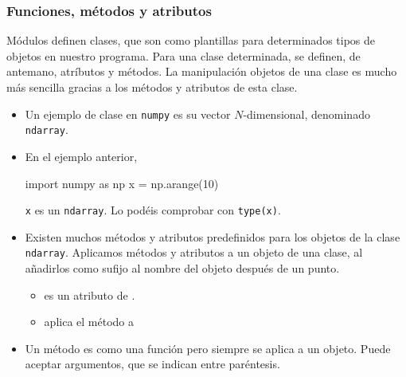 \documentclass[handout,9pt]{beamer}
\begin{document}
\begin{frame}[fragile]
  \frametitle{Funciones, métodos y atributos}
  \begin{block}{}
    Módulos definen clases, que son como plantillas para determinados
    tipos de objetos en nuestro programa. Para una clase determinada,
    se definen, de antemano, atríbutos y métodos. La manipulación
    objetos de una clase es mucho más sencilla gracias a los métodos y
    atributos de esta clase.
  \end{block}
  \begin{itemize}
  \item<2-> Un ejemplo de clase en  {\tt numpy} es su vector
    $N$-dimensional, denominado {\tt ndarray}.
  \item<3-> En el ejemplo anterior,
        \begin{pyverbatim}
import numpy as np
x = np.arange(10)          
\end{pyverbatim}
{\tt x} es un {\tt ndarray}. Lo podéis comprobar con  {\tt type(x)}.
\item<4-> Existen muchos métodos y atributos predefinidos para los
  objetos de la clase  {\tt ndarray}. Aplicamos métodos y atributos a
  un objeto de una clase, al añadirlos como sufijo al nombre del
  objeto después de un punto.
  \begin{itemize}
  \item<5->  es un atributo de  .
  \item<5->  aplica el método  a 
  \end{itemize}
\item<6-> Un método es como una función pero siempre se aplica a un
  objeto. Puede aceptar argumentos, que se indican entre paréntesis.
  \end{itemize}
\end{frame}
\end{document}
